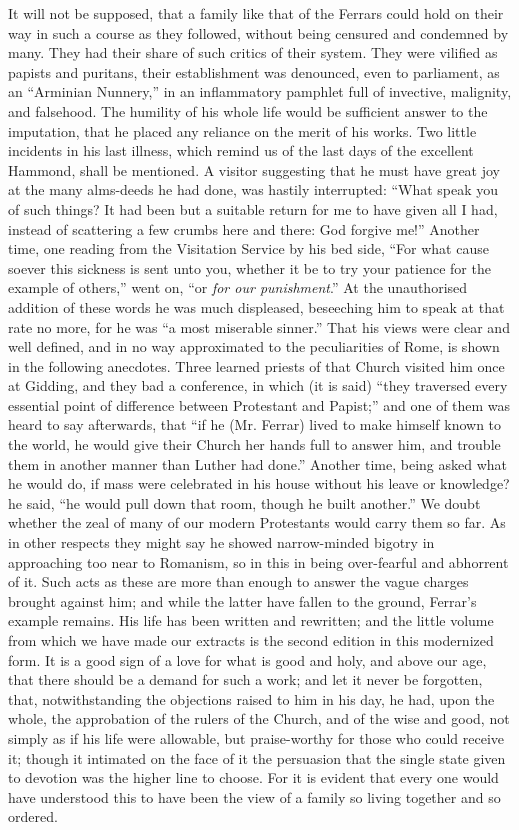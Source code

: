 It will not be supposed, that a family like that of
the Ferrars could hold on their way in such a course as they followed,
without being censured and condemned by many. They had their share of
such critics of their system. They were vilified as papists and
puritans, their establishment was denounced, even to parliament, as an ``Arminian
Nunnery,'' in an inflammatory pamphlet full of invective, malignity, and
falsehood. The humility of his whole life would be sufficient answer to
the imputation, that he placed any reliance on the merit of his works.
Two little incidents in his last illness, which remind us of the last
days of the excellent Hammond, shall be mentioned. A visitor
suggesting that he must have great joy at the many alms-deeds he had
done, was hastily interrupted: ``What speak you of such things? It had
been but a suitable return for me to have given all I had, instead of
scattering a few crumbs here and there: God forgive me!'' Another time,
one reading from the Visitation Service by his bed side, ``For what cause
soever this sickness is sent unto you, whether it be to try your
patience for the example of others,'' went on, ``or \emph{for our punishment}.''
At the unauthorised addition of these words he was much displeased,
beseeching him to speak at that rate no more, for he was ``a most
miserable sinner.'' That his views were clear and well defined, and in no
way approximated to the peculiarities of Rome, is shown in the following
anecdotes. Three learned priests of that Church visited him once at
Gidding, and they bad a conference, in which (it is said) ``they
traversed every essential point of difference between Protestant and
Papist;'' and one of them was heard to say afterwards, that ``if he (Mr.
Ferrar) lived to make himself known to the world, he would give their
Church her hands full to answer him, and trouble them in another manner
than Luther had done.'' Another time, being asked what he would do, if
mass were celebrated in his house without his leave or knowledge? he
said, ``he would pull down that room, though he built another.'' We doubt
whether the zeal of many of our modern Protestants would carry them so
far. As in other respects they might say he showed narrow-minded bigotry
in approaching too near to Romanism, so in this in being over-fearful
and abhorrent of it. Such acts as these are more than enough to answer
the vague charges brought against him; and while the latter have fallen
to the ground, Ferrar's example remains. His life has been written and
rewritten; and the little volume from which we have made our extracts is
the second edition in this modernized form. It is a good sign of a love
for what is good and holy, and above our age, that there should be a
demand for such a work; and let it never be forgotten, that,
notwithstanding the objections raised to him in his day, he had, upon
the whole, the approbation of the rulers of the Church, and of the wise
and good, not simply as if his life were allowable, but praise-worthy
for those who could receive it; though it intimated on the face of it
the persuasion that the single state given to devotion was the higher
line to choose. For it is evident that every one would have understood
this to have been the view of a family so living together and so
ordered.

